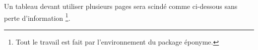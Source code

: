 \documentclass[12pt,a4paper]{article}
\begin{document}
Un tableau devant utiliser plusieurs pages sera scindé comme ci-dessous sans perte d'information
\footnote{
	Tout le travail est fait par l'environnement  du package éponyme.
}.

\begin{center}
\end{center}
\end{document}
